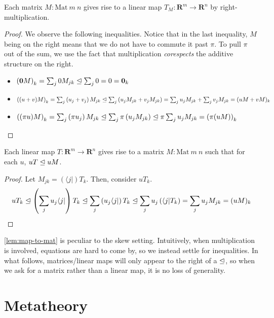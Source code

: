 \documentclass[submission,copyright,creativecommons]{eptcs}
\begin{document}
\begin{lemma}\label{lem:mat-to-map}
  Each matrix $M : \mathrm{Mat}~m~n$ gives rise to a linear map
  $T_M : \mathbf R^m \to \mathbf R^n$ by right-multiplication.
\end{lemma}
\begin{proof}
  We observe the following inequalities.
  Notice that in the last inequality, $M$ being on the right means that we do
  not have to commute it past $\pi$.
  To pull $\pi$ out of the sum, we use the fact that multiplication
  \emph{corespects} the additive structure on the right.
  \begin{itemize}
    \item $\left(\mathbf{0}M\right)_{k}
      = \sum_j 0M_{jk}
      \trianglelefteq \sum_j 0
      = 0
      = \mathbf{0}_{k}$
    \item $\left((u + v)M\right)_{k}
      = \sum_j \left(u_j + v_j\right)M_{jk}
      \trianglelefteq \sum_j \left(u_jM_{jk} + v_jM_{jk}\right)
      = \sum_j u_jM_{jk} + \sum_j v_jM_{jk}
      = (uM + vM)_{k}$
    \item $\left((\pi u)M\right)_{k}
      = \sum_j \left(\pi u_j\right)M_{jk}
      \trianglelefteq \sum_j \pi\left(u_jM_{jk}\right)
      \trianglelefteq \pi\sum_j u_jM_{jk}
      = \left(\pi(uM)\right)_{k}$
  \end{itemize}
\end{proof}

\begin{lemma}\label{lem:map-to-mat}
  Each linear map $T : \mathbf R^m \to \mathbf R^n$ gives rise to a matrix
  $M : \mathrm{Mat}~m~n$ such that for each $u$, $uT \trianglelefteq uM$.
\end{lemma}
\begin{proof}
  Let $M_{jk} = (\langle j \rvert)T_k$.
  Then, consider $uT_k$.
  \[
    uT_k \trianglelefteq \left(\sum_j u_j\langle j \rvert\right)T_k
    \trianglelefteq \sum_j \left(u_j\langle j \rvert\right) T_k
    \trianglelefteq \sum_j u_j\left(\langle j \rvert T_k\right)
    = \sum_j u_j M_{jk} = (uM)_k
  \]
\end{proof}

\autoref{lem:map-to-mat} is peculiar to the skew setting.
Intuitively, when multiplication is involved, equations are hard to come by, so
we instead settle for inequalities.
In what follows, matrices/linear maps will only appear to the right of a
$\trianglelefteq$, so when we ask for a matrix rather than a linear map, it is no loss
of generality.

\section{Metatheory}\label{sec:metatheory}
\end{document}
